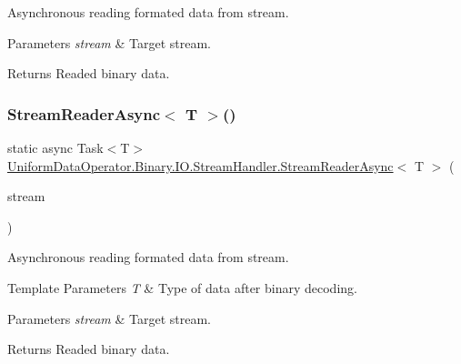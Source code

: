 Asynchronous reading formated data from stream. 


\begin{DoxyParams}{Parameters}
{\em stream} & Target stream.\\
\hline
\end{DoxyParams}
\begin{DoxyReturn}{Returns}
Readed binary data.
\end{DoxyReturn}
\mbox{\label{class_uniform_data_operator_1_1_binary_1_1_i_o_1_1_stream_handler_ab22ce5f10fb894fff4a675e96917dfbf}} 
\subsubsection{\texorpdfstring{Stream\+Reader\+Async$<$ T $>$()}{StreamReaderAsync< T >()}}
{\footnotesize\ttfamily static async Task$<$T$>$ \mbox{\hyperlink{class_uniform_data_operator_1_1_binary_1_1_i_o_1_1_stream_handler_a8953608e9eefaff797f3e4ed49f85bcf}{Uniform\+Data\+Operator.\+Binary.\+I\+O.\+Stream\+Handler.\+Stream\+Reader\+Async}}$<$ T $>$ (\begin{DoxyParamCaption}\item[{Pipe\+Stream}]{stream }\end{DoxyParamCaption})\hspace{0.3cm}{\ttfamily [static]}}



Asynchronous reading formated data from stream. 


\begin{DoxyTemplParams}{Template Parameters}
{\em T} & Type of data after binary decoding.\\
\hline
\end{DoxyTemplParams}

\begin{DoxyParams}{Parameters}
{\em stream} & Target stream.\\
\hline
\end{DoxyParams}
\begin{DoxyReturn}{Returns}
Readed binary data.
\end{DoxyReturn}
\mbox{\label{class_uniform_data_operator_1_1_binary_1_1_i_o_1_1_stream_handler_a20c247a11a6523790a60e98f5f704fc7}} 
